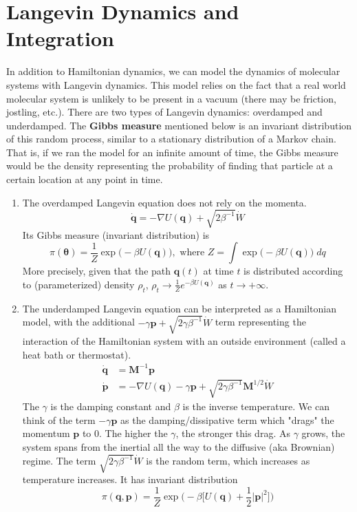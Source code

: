 \documentclass{article}
\theoremstyle{remark}
\theoremstyle{definition}
\begin{document}
\section{Langevin Dynamics and Integration}
In addition to Hamiltonian dynamics, we can model the dynamics of molecular systems with Langevin dynamics. This model relies on the fact that a real world molecular system is unlikely to be present in a vacuum (there may be friction, jostling, etc.). There are two types of Langevin dynamics: overdamped and underdamped. The \textbf{Gibbs measure} mentioned below is an invariant distribution of this random process, similar to a stationary distribution of a Markov chain. That is, if we ran the model for an infinite amount of time, the Gibbs measure would be the density representing the probability of finding that particle at a certain location at any point in time. 
\begin{enumerate}
    \item The overdamped Langevin equation does not rely on the momenta. 
    \[\mathbf{\dot{q}} = - \nabla U(\mathbf{q}) + \sqrt{2 \beta^{-1}} \dot{W}\]
    Its Gibbs measure (invariant distribution) is 
    \[\pi(\boldsymbol{\theta}) = \frac{1}{Z} \exp\big( - \beta U(\mathbf{q})\big), \text{ where } Z = \int \exp\big( - \beta U(\mathbf{q})\big)\; dq\]
    More precisely, given that the path $\mathbf{q}(t)$ at time $t$ is distributed according to (parameterized) density $\rho_t$, $\rho_t \rightarrow \frac{1}{Z} e^{-\beta U(\mathbf{q})}$ as $t \rightarrow +\infty$. 
    \item The underdamped Langevin equation can be interpreted as a Hamiltonian model, with the additional $- \gamma \mathbf{p} + \sqrt{2\gamma \beta^{-1}} \dot{W}$ term representing the interaction of the Hamiltonian system with an outside environment (called a heat bath or thermostat). 
    \begin{align*}
        \mathbf{\dot{q}} & = \mathbf{M}^{-1} \mathbf{p} \\
        \mathbf{\dot{p}} & = - \nabla U(\mathbf{q}) - \gamma \mathbf{p} + \sqrt{2\gamma \beta^{-1}} \mathbf{M}^{1/2} \dot{W}
    \end{align*}
    The $\gamma$ is the damping constant and $\beta$ is the inverse temperature. We can think of the term $-\gamma \mathbf{p}$ as the damping/dissipative term which "drags" the momentum $\mathbf{p}$ to $0$. The higher the $\gamma$, the stronger this drag. As $\gamma$ grows, the system spans from the inertial all the way to the diffusive (aka Brownian) regime. The term $\sqrt{2 \gamma \beta^{-1}} \dot{W}$ is the random term, which increases as temperature increases. It has invariant distribution 
    \[\pi(\boldsymbol{q}, \boldsymbol{p}) = \frac{1}{Z} \exp\big( -\beta \big[ U(\mathbf{q}) + \frac{1}{2} |\mathbf{p}|^2\big] \big)\]
\end{enumerate}
\end{document}
